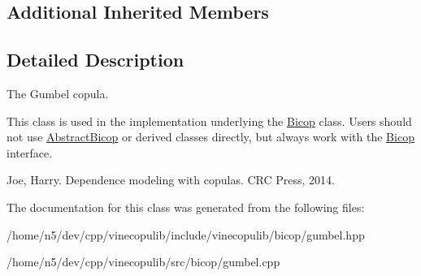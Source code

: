\subsection*{Additional Inherited Members}


\subsection{Detailed Description}
The Gumbel copula. 

This class is used in the implementation underlying the \hyperlink{classvinecopulib_1_1_bicop}{Bicop} class. Users should not use \hyperlink{classvinecopulib_1_1_abstract_bicop}{Abstract\+Bicop} or derived classes directly, but always work with the \hyperlink{classvinecopulib_1_1_bicop}{Bicop} interface.

Joe, Harry. Dependence modeling with copulas. C\+RC Press, 2014. 

The documentation for this class was generated from the following files\+:\begin{DoxyCompactItemize}
\item 
/home/n5/dev/cpp/vinecopulib/include/vinecopulib/bicop/gumbel.\+hpp\item 
/home/n5/dev/cpp/vinecopulib/src/bicop/gumbel.\+cpp\end{DoxyCompactItemize}
